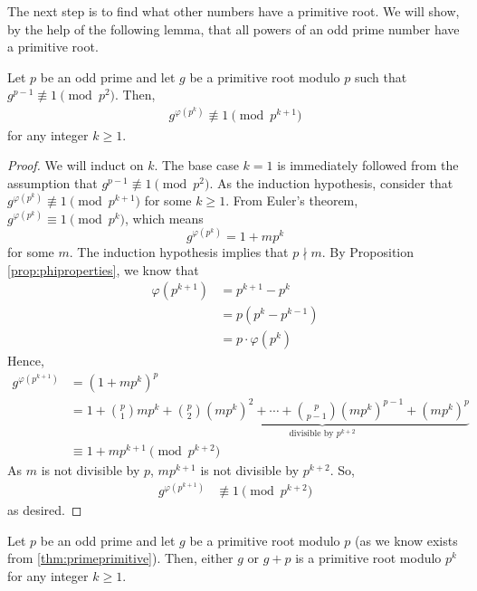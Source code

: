 The next step is to find what other numbers have a primitive root. We will show, by the help of the following lemma, that all powers of an odd prime number have a primitive root.

\begin{lemma}
	Let $p$ be an odd prime and let $g$ be a primitive root modulo $p$ such that $g^{p-1} \not \equiv 1 \pmod{p^2}$. Then,
		\begin{align*}
			g^{\varphi(p^k)} \not \equiv 1 \pmod{p^{k+1}}
		\end{align*}
	for any integer $k \geq 1$.
\end{lemma}

\begin{proof}
	We will induct on $k$. The base case $k=1$ is immediately followed from the assumption that $g^{p-1} \not \equiv 1 \pmod{p^2}$. As the induction hypothesis, consider that $g^{\varphi(p^k)} \not \equiv 1 \pmod{p^{k+1}}$ for some $k\geq 1$. From Euler's theorem, $g^{\varphi(p^k)} \equiv 1 \pmod{p^k}$, which means $$g^{\varphi(p^k)} = 1+mp^k$$ for some $m$. The induction hypothesis implies that $p \nmid m$. By Proposition \ref{prop:phiproperties}, we know that
		\begin{align*}
			\varphi(p^{k+1})
				& =p^{k+1}-p^k\\
				& =p\left(p^k - p^{k-1}\right)\\
				& =p\cdot \varphi(p^k)
		\end{align*}
	Hence,
		\begin{align*}
			g^{\varphi(p^{k+1})}
				& = (1+mp^k)^p \\
				& = 1+ \binom{p}{1}mp^k + \underbrace{\binom{p}{2} (mp^k)^2 + \cdots +\binom{p}{p-1} (mp^k)^{p-1} +(mp^k)^p}_{\mbox{divisible by }p^{k+2}}\\
				& \equiv 1+mp^{k+1} \pmod {p^{k+2}}
		\end{align*}
	As $m$ is not divisible by $p$, $mp^{k+1}$ is not divisible by $p^{k+2}$. So,
		\begin{align*}
			g^{\varphi(p^{k+1})}
				& \not \equiv 1 \pmod {p^{k+2}}
		\end{align*}
	as desired.
\end{proof}

\begin{theorem}\label{thm:primepowerprimitive}
	Let $p$ be an odd prime and let $g$ be a primitive root modulo $p$ (as we know exists from \autoref{thm:primeprimitive}). Then, either $g$ or $g+p$ is a primitive root modulo $p^k$ for any integer $k\geq 1$.
\end{theorem}

